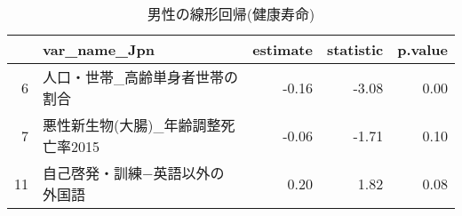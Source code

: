 \begin{table}[ht]
\centering
\caption{男性の線形回帰(健康寿命)} 
\label{UsualHLMLEf}
\begingroup\tiny
\begin{adjustbox}{width=1\textwidth}
\begin{tabular}{rlrrr}
  \hline
 & var\_name\_Jpn & estimate & statistic & p.value \\ 
  \hline
  6 & 人口・世帯\_高齢単身者世帯の割合 & -0.16 & -3.08 & 0.00 \\ 
  7 & 悪性新生物(大腸)\_年齢調整死亡率2015 & -0.06 & -1.71 & 0.10 \\ 
  11 & 自己啓発・訓練−英語以外の外国語 & 0.20 & 1.82 & 0.08 \\ 
   \hline
\end{tabular}
\end{adjustbox}
\endgroup
\end{table}
